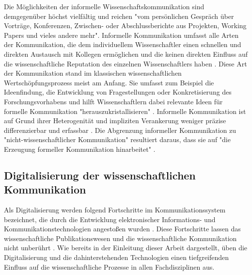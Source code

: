 Die Möglichkeiten der informelle Wissenschaftskommunikation sind demgegenüber höchst vielfältig und reichen "vom persönlichen Gespräch über Vorträge, Konferenzen, Zwischen- oder Abschlussberichte aus Projekten, Working Papers und vieles andere mehr"\cite{Hanekop_2014}. Informelle Kommunikation umfasst alle Arten der Kommunikation, die dem individuellem Wissenschaftler einen schnellen und direkten Austausch mit Kollegen ermöglichen und die keinen direkten Einfluss auf die wissenschaftliche Reputation des einzelnen Wissenschaftlers haben \cite{suchen}. Diese Art der Kommunikation stand im klassischen wissenschaftlichen Wertschöpfungsprozess meist am Anfang. Sie umfasst zum Beispiel die Ideenfindung, die Entwicklung von Fragestellungen oder Konkretisierung des Forschungsvorhabens und hilft Wissenschaftlern dabei relevante Ideen für formelle Kommunikation "herauszukristallisieren" \cite{Hanekop_2014}. Informelle Kommunikation ist auf Grund ihrer Heterogenität und impliziten Verankerung weniger präzise differenzierbar und erfassbar \cite{kaden_2009_library}. Die Abgrenzung informeller Kommunikation zu "nicht-wissenschaftlicher Kommunikation" resultiert daraus, dass sie auf "die Erzeugung formeller Kommunikation hinarbeitet" \cite{kaden_2009_library}.

\subsection{Digitalisierung der wissenschaftlichen Kommunikation}

Als Digitalisierung werden folgend Fortschritte im Kommunikationssystem bezeichnet, die durch die Entwicklung elektronischer Informations- und Kommunikationstechnologien angestoßen wurden \cite{bbaw_publizieren_2015}. Diese Fortschritte lassen das wissenschaftliche Publikationswesen und die wissenschaftliche Kommunikation nicht unberührt \cite{naeder_2010_open}. Wie bereits in der Einleitung dieser Arbeit dargestellt, üben die Digitalisierung und die dahinterstehenden Technologien einen tiefgreifenden Einfluss auf die wissenschaftliche Prozesse in allen Fachdisziplinen aus.

